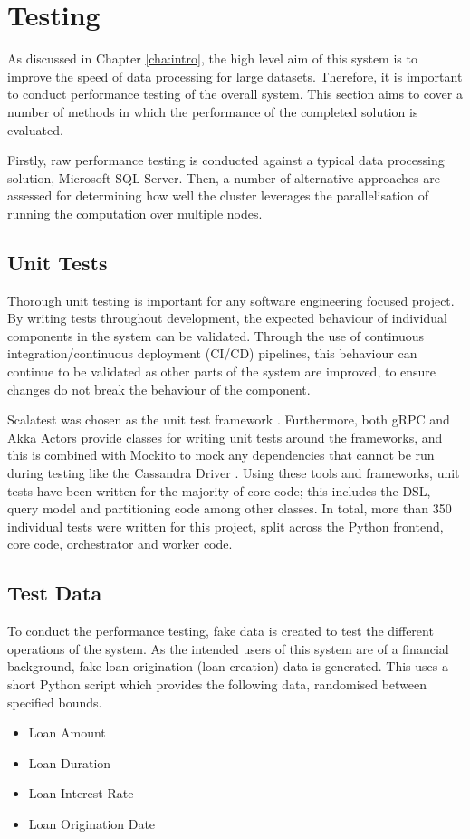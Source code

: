 \chapter{Testing}\label{cha:testing}


As discussed in Chapter \ref{cha:intro}, the high level aim of this system is to improve the speed of data processing for large datasets. Therefore, it is important to conduct performance testing of the overall system. This section aims to cover a number of methods in which the performance of the completed solution is evaluated.

Firstly, raw performance testing is conducted against a typical data processing solution, Microsoft SQL Server. Then, a number of alternative approaches are assessed for determining how well the cluster leverages the parallelisation of running the computation over multiple nodes.

\section{Unit Tests}
Thorough unit testing is important for any software engineering focused project. By writing tests throughout development, the expected behaviour of individual components in the system can be validated. Through the use of continuous integration/continuous deployment (CI/CD) pipelines, this behaviour can continue to be validated as other parts of the system are improved, to ensure changes do not break the behaviour of the component. 

Scalatest was chosen as the unit test framework . Furthermore, both gRPC and Akka Actors provide classes for writing unit tests around the frameworks, and this is combined with Mockito to mock any dependencies that cannot be run during testing like the Cassandra Driver . Using these tools and frameworks, unit tests have been written for the majority of core code; this includes the DSL, query model and partitioning code among other classes. In total, more than 350 individual tests were written for this project, split across the Python frontend, core code, orchestrator and worker code.

\section{Test Data}
To conduct the performance testing, fake data is created to test the different operations of the system. As the intended users of this system are of a financial background, fake loan origination (loan creation) data is generated. This uses a short Python script which provides the following data, randomised between specified bounds.
\begin{itemize}
	\item Loan Amount
	\item Loan Duration
	\item Loan Interest Rate
	\item Loan Origination Date
\end{itemize}

